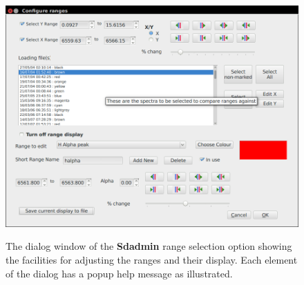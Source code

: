 \begin{figure}[!htbp]
\begin{center}
\includegraphics[scale=0.4]{Figures/sdadmindlg.png} \\
\end{center}   
\caption{The dialog window of the \textbf{Sdadmin} range selection option showing the facilities for adjusting the
  ranges and their display. Each element of the dialog has a popup help message as illustrated.}
 \protect\label{fig:sdadmindlg}
\end{figure}
